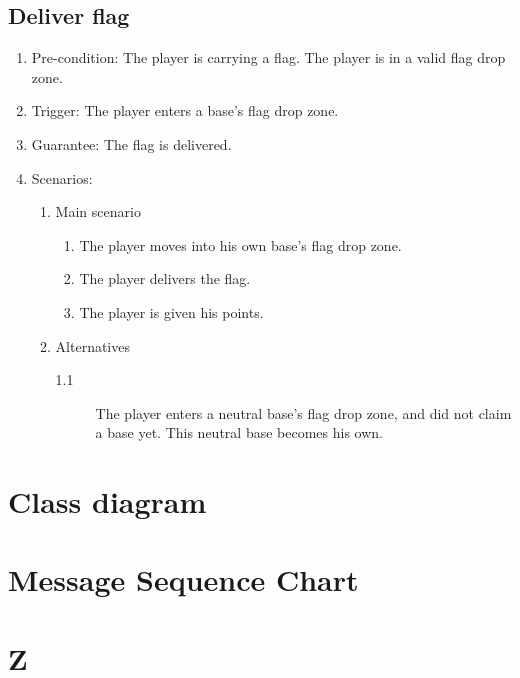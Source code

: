 \documentclass[a4paper,twoside,11pt]{article}
\begin{document}
\subsection*{Deliver flag}
\begin{enumerate}
\item Pre-condition: The player is carrying a flag. The player is in a valid flag drop zone.
\item Trigger: The player enters a base's flag drop zone.
\item Guarantee: The flag is delivered.
\item Scenarios: 
	\begin{enumerate}
	\item Main scenario
		\begin{enumerate}[1)]
		\item The player moves into his own base's flag drop zone.
		\item The player delivers the flag.
		\item The player is given his points.
		\end{enumerate}
	\item Alternatives
		\begin{description}
		\item[1.1] The player enters a neutral base's flag drop zone, 			and did	not claim a base yet. This neutral base becomes his 			own.
		\end{description}
	\end{enumerate}
\end{enumerate}
\section{Class diagram}

\section{Message Sequence Chart}

\section{Z}
\end{document}

